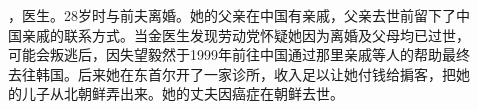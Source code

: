 \begin{multicols}{\theparacolNo}
\begin{description}
	\item[] ，医生。28岁时与前夫离婚。她的父亲在中国有亲戚，父亲去世前留下了中国亲戚的联系方式。当金医生发现劳动党怀疑她因为离婚及父母均已过世，可能会叛逃后，因失望毅然于1999年前往中国通过那里亲戚等人的帮助最终去往韩国。后来她在东首尔开了一家诊所，收入足以让她付钱给掮客，把她的儿子从北朝鲜弄出来。她的丈夫因癌症在朝鲜去世。\\
\end{description}
\ifnum{}
	\end{multicols}
\fi
